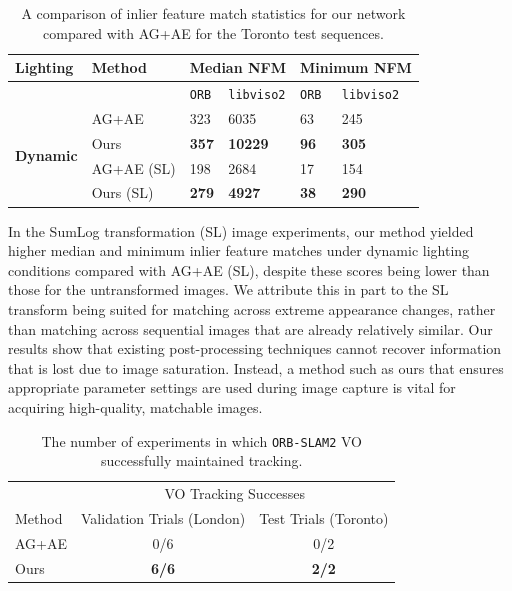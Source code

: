 \documentclass[letterpaper, 10pt, journal, twoside]{IEEEtran}
\begin{document}
\begin{table}[t]
	\centering
	\caption{A comparison of inlier feature match statistics for our network compared with AG+AE for the Toronto test sequences.}
	\vspace{0mm}
	\label{tab2}
	\begin{threeparttable}
	\begin{tabular}{@{}llllll@{}}
			\toprule
			Lighting & Method & \multicolumn{2}{l}{Median NFM} & \multicolumn{2}{l}{Minimum NFM} \\ \midrule
			& 	                          & \texttt{ORB} & \texttt{libviso2} & \texttt{ORB} & \texttt{libviso2}\\ \cmidrule{3-6}
			\multirow{4}{*}{\textbf{Dynamic}} 
			& AG+AE                       & 323          & 6035              & 63          & 245 \\
			& Ours                        & \textbf{357} & \textbf{10229}    & \textbf{96} & \textbf{305}\\ \cmidrule{3-6}  
			& AG+AE (SL)              & 198          & 2684              & 17          & 154\\
			& Ours (SL)               & \textbf{279} & \textbf{4927}     & \textbf{38} & \textbf{290} \\ \bottomrule
		\end{tabular}
	\end{threeparttable}
	\vspace{-4mm}
	\end{table}

In the SumLog transformation (SL) image experiments, our method yielded higher median and minimum inlier feature matches under dynamic lighting conditions compared with AG+AE (SL), despite these scores being lower than those for the untransformed images. We attribute this in part to the SL transform being suited for matching across extreme appearance changes, rather than matching across sequential images that are already relatively similar. Our results show that existing post-processing techniques cannot recover information that is lost due to image saturation. Instead, a method such as ours that ensures appropriate parameter settings are used during image capture is vital for acquiring high-quality, matchable images.

\begin{table}[t]
	\centering
	\caption{The number of experiments in which \texttt{ORB-SLAM2} VO successfully maintained tracking.}
	\label{tab3}
	\begin{threeparttable}
	\begin{tabular}{@{}lcc@{}}
			\toprule
			 & \multicolumn{2}{c}{VO Tracking Successes}\\
			\cmidrule{2-3}
			Method & Validation Trials (London) & Test Trials (Toronto)\\ \midrule
			AG+AE & 0/6 & 0/2\\
			Ours & \textbf{6/6}& \textbf{2/2} \\ \bottomrule
		\end{tabular}
	\end{threeparttable}
	\vspace{-4mm}
	\end{table}
\end{document}

